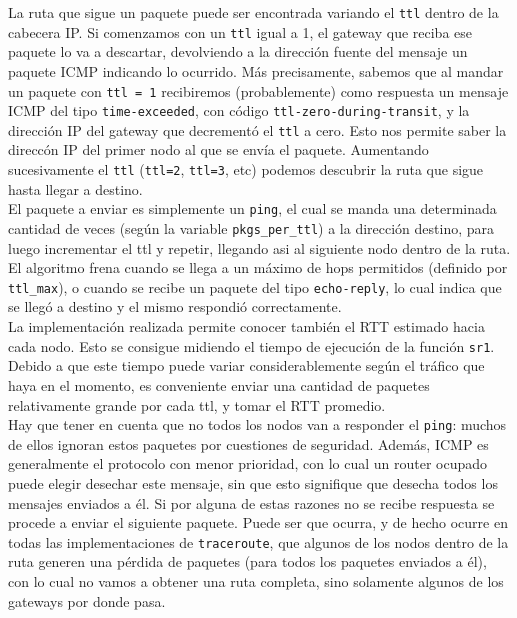  La ruta que sigue un paquete puede ser encontrada variando el \texttt{ttl} dentro de la cabecera IP. Si comenzamos con un \texttt{ttl} igual a 1, el gateway que reciba ese paquete lo va a descartar, devolviendo a la direcci\'on fuente del mensaje un paquete ICMP indicando lo ocurrido. M\'as precisamente, sabemos que al mandar un paquete con \texttt{ttl = 1} recibiremos (probablemente) como respuesta un mensaje ICMP del tipo \texttt{time-exceeded}, con c\'odigo \texttt{ttl-zero-during-transit}, y la direcci\'on IP del gateway que decrement\'o el \texttt{ttl} a cero. Esto nos permite saber la direcc\'on IP del primer nodo al que se env\'ia el paquete. Aumentando sucesivamente el \texttt{ttl} (\texttt{ttl=2}, \texttt{ttl=3}, etc) podemos descubrir la ruta que sigue hasta llegar a destino.\\
 
 El paquete a enviar es simplemente un \texttt{ping}, el cual se manda una determinada cantidad de veces (seg\'un la variable \texttt{pkgs\_per\_ttl}) a la direcci\'on destino, para luego incrementar el ttl y repetir, llegando asi al siguiente nodo dentro de la ruta.\\
 
 El algoritmo frena cuando se llega a un m\'aximo de hops permitidos (definido por \texttt{ttl\_max}), o cuando se recibe un paquete del tipo \texttt{echo-reply}, lo cual indica que se lleg\'o a destino y el mismo respondi\'o correctamente.\\
 
 La implementaci\'on realizada permite conocer tambi\'en el RTT estimado hacia cada nodo. Esto se consigue midiendo el tiempo de ejecuci\'on de la funci\'on \texttt{sr1}. Debido a que este tiempo puede variar considerablemente seg\'un el tr\'afico que haya en el momento, es conveniente enviar una cantidad de paquetes relativamente grande por cada ttl, y tomar el RTT promedio.\\
 
 Hay que tener en cuenta que no todos los nodos van a responder el \texttt{ping}: muchos de ellos ignoran estos paquetes por cuestiones de seguridad. Adem\'as, ICMP es generalmente el protocolo con menor prioridad, con lo cual un router ocupado puede elegir desechar este mensaje, sin que esto signifique que desecha todos los mensajes enviados a \'el. Si por alguna de estas razones no se recibe respuesta se procede a enviar el siguiente paquete. Puede ser que ocurra, y de hecho ocurre en todas las implementaciones de \texttt{traceroute}, que algunos de los nodos dentro de la ruta generen una p\'erdida de paquetes (para todos los paquetes enviados a \'el), con lo cual no vamos a obtener una ruta completa, sino solamente algunos de los gateways por donde pasa.\\
 
